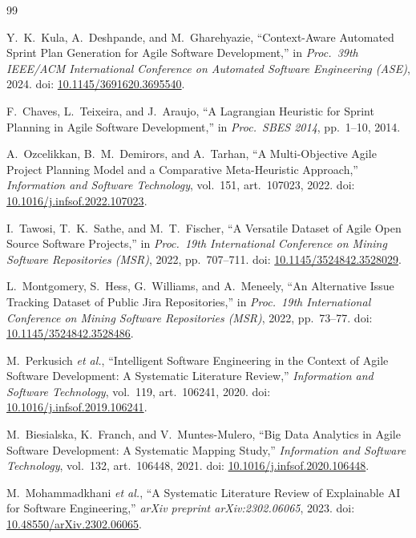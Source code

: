 \documentclass[conference]{IEEEtran}
\begin{document}
\begin{thebibliography}{99}

Y.\ K.\ Kula, A.\ Deshpande, and M.\ Gharehyazie,
``Context-Aware Automated Sprint Plan Generation for Agile Software Development,''
in \emph{Proc.\ 39th IEEE/ACM International Conference on Automated Software
Engineering (ASE)}, 2024.
doi: \href{https://doi.org/10.1145/3691620.3695540}{10.1145/3691620.3695540}.

F.\ Chaves, L.\ Teixeira, and J.\ Araujo,
``A Lagrangian Heuristic for Sprint Planning in Agile Software Development,''
in \emph{Proc.\ SBES 2014},
pp.~1--10, 2014.

A.\ Ozcelikkan, B.\ M.\ Demirors, and A.\ Tarhan,
``A Multi-Objective Agile Project Planning Model and a Comparative Meta-Heuristic
Approach,''
\emph{Information and Software Technology},
vol.~151, art.~107023, 2022.
doi: \href{https://doi.org/10.1016/j.infsof.2022.107023}{10.1016/j.infsof.2022.107023}.

I.\ Tawosi, T.\ K.\ Sathe, and M.\ T.\ Fischer,
``A Versatile Dataset of Agile Open Source Software Projects,''
in \emph{Proc.\ 19th International Conference on Mining Software Repositories
(MSR)}, 2022, pp.~707--711.
doi: \href{https://doi.org/10.1145/3524842.3528029}{10.1145/3524842.3528029}.

L.\ Montgomery, S.\ Hess, G.\ Williams, and A.\ Meneely,
``An Alternative Issue Tracking Dataset of Public Jira Repositories,''
in \emph{Proc.\ 19th International Conference on Mining Software Repositories
(MSR)}, 2022, pp.~73--77.
doi: \href{https://doi.org/10.1145/3524842.3528486}{10.1145/3524842.3528486}.

M.\ Perkusich \emph{et al.},
``Intelligent Software Engineering in the Context of Agile Software Development:
A Systematic Literature Review,''
\emph{Information and Software Technology},
vol.~119, art.~106241, 2020.
doi: \href{https://doi.org/10.1016/j.infsof.2019.106241}{10.1016/j.infsof.2019.106241}.

M.\ Biesialska, K.\ Franch, and V.\ Muntes-Mulero,
``Big Data Analytics in Agile Software Development: A Systematic Mapping Study,''
\emph{Information and Software Technology},
vol.~132, art.~106448, 2021.
doi: \href{https://doi.org/10.1016/j.infsof.2020.106448}{10.1016/j.infsof.2020.106448}.

M.\ Mohammadkhani \emph{et al.},
``A Systematic Literature Review of Explainable AI for Software Engineering,''
\emph{arXiv preprint arXiv:2302.06065}, 2023.
doi: \href{https://doi.org/10.48550/arXiv.2302.06065}{10.48550/arXiv.2302.06065}.


\end{thebibliography}
\end{document}
